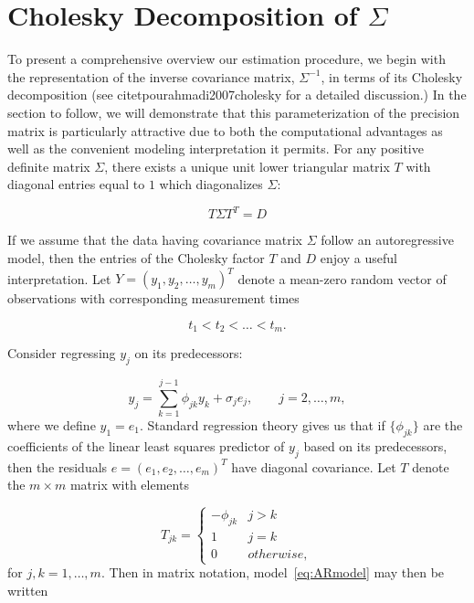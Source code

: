 \documentclass[12pt]{article}
\theoremstyle{definition}
\begin{document}
\section{Cholesky Decomposition of $\Sigma$}

To present a comprehensive overview our estimation procedure, we begin with the representation of the inverse covariance matrix, $\Sigma^{-1}$, in terms of its Cholesky decomposition (see citet{pourahmadi2007cholesky} for a detailed discussion.) In the section to follow, we will demonstrate that this parameterization of the precision matrix is particularly attractive due to both the computational advantages as well as the convenient modeling interpretation it permits. For any positive definite matrix $\Sigma$, there exists a unique unit lower triangular matrix $T$ with diagonal entries equal to $1$ which diagonalizes $\Sigma$:

\begin{equation}
\nonumber T \Sigma T^T = D
\end{equation}
\noindent

If we assume that the data having covariance matrix $\Sigma$ follow an autoregressive model, then the entries of the Cholesky factor $T$ and $D$ enjoy a useful interpretation. Let $Y = \left( y_{1}, y_{2}, \dots, y_{m} \right)^T$ denote a mean-zero random vector of observations with corresponding measurement times 

\[
t_{1} < t_{2} < \dots< t_{m}.
\]

Consider regressing $y_{j}$  on its predecessors:

\begin{equation}
{y}_{j}  = \sum_{k=1}^{j-1} \phi_{jk} y_{k} + \sigma_{j}e_{j}, \qquad j=2,\dots,m, \label{eq:ARmodel}
\end{equation}
\noindent where we define $y_{1}=e_{1}$. Standard regression theory gives us that if $\lbrace \phi_{jk} \rbrace$ are the coefficients of the linear least squares predictor of $y_{j}$ based on its predecessors, then the residuals $e =\left( e_{1}, e_{2},\dots, e_{m} \right)^T$ have diagonal covariance. Let $T$ denote the $m \times m$  matrix with elements 

\[
T_{jk} = \left\{
\begin{array}{ll}
-\phi_{jk} & j > k\\
1 & j = k \\
0 & otherwise,
\end{array}\right.
\]
\noindent
for $j,k=1,\dots,m$. Then in matrix notation,  model~\ref{eq:ARmodel} may then be written
\end{document}
